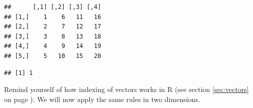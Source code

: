 \documentclass[krantz2]{krantz}\usepackage{knitr}%
\begin{document}
\begin{knitrout}\footnotesize
{}\color{fgcolor}\begin{kframe}
\begin{alltt}
 \hlkwb{<-} \hlstd{(}\hlopt{:}\hlstd{,}  \hlstd{=} \hlstd{)}
\end{alltt}
\begin{verbatim}
##      [,1] [,2] [,3] [,4]
## [1,]    1    6   11   16
## [2,]    2    7   12   17
## [3,]    3    8   13   18
## [4,]    4    9   14   19
## [5,]    5   10   15   20
\end{verbatim}
\begin{alltt}
\hlstd{A[}\hlstd{,} \hlstd{]}
\end{alltt}
\begin{verbatim}
## [1] 1
\end{verbatim}
\end{kframe}
\end{knitrout}

Remind yourself of how indexing of vectors works in R (see section \ref{sec:vectors} on page \pageref{sec:vectors}). We will now apply the same rules in two dimensions.
\end{document}
